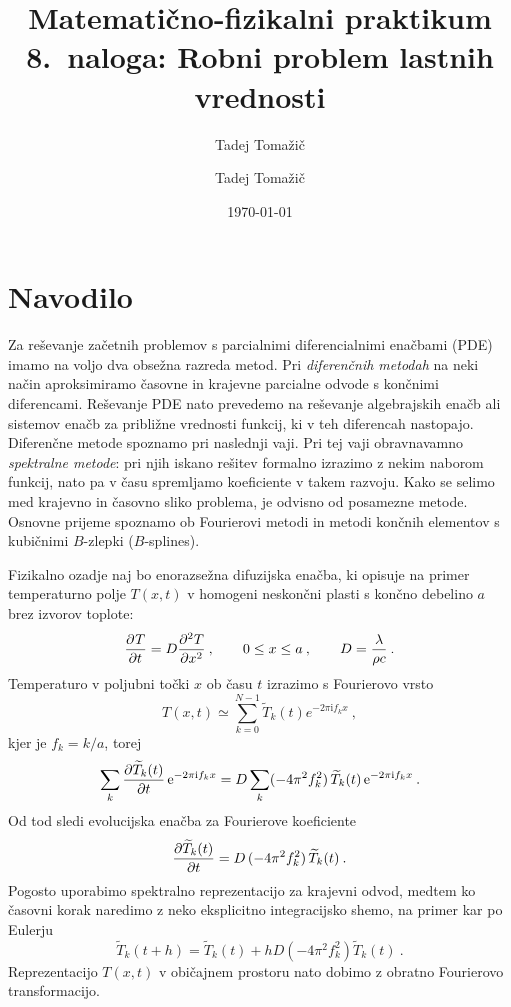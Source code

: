 \documentclass[slovene,11pt,a4paper]{article}
\title{
\sc\large Matematično-fizikalni praktikum \thisyear \\
\bigskip
\bf\Large 8.~naloga: Robni problem lastnih vrednosti
}
\author{Tadej Tomažič}
\date{}
\newcommand{\pd}{\partial}
\newcommand{\Pd}[3][{}]{\frac{\pd^{#1} #2}{\pd #3^{#1}}}
\begin{document}
\author{Tadej Tomažič}
\date{\today}

\maketitle

\newpage
{}
\tableofcontents
\listoffigures
\newpage
\vspace{-1cm}
\section{Navodilo}

Za reševanje začetnih problemov s parcialnimi diferencialnimi
enačbami (PDE) imamo na voljo dva obsežna razreda metod.
Pri {\sl diferenčnih metodah\/} na neki način aproksimiramo
časovne in krajevne parcialne odvode s končnimi diferencami.
Reševanje PDE nato prevedemo na reševanje algebrajskih enačb
ali sistemov enačb za približne vrednosti funkcij, ki v teh
diferencah nastopajo.  Diferenčne metode spoznamo pri
naslednji vaji.  Pri tej vaji obravnavamno {\sl spektralne metode\/}:
pri njih iskano rešitev formalno izrazimo z nekim naborom funkcij,
nato pa v času spremljamo koeficiente v takem razvoju.  Kako se
selimo med krajevno in časovno sliko problema, je odvisno
od posamezne metode.  Osnovne prijeme spoznamo ob Fourierovi
metodi in  metodi končnih elementov s kubičnimi $B$-zlepki ($B$-splines).

Fizikalno ozadje naj bo enorazsežna difuzijska enačba,
ki opisuje na primer temperaturno polje $T(x,t)$ v homogeni
neskončni plasti s končno debelino $a$ brez izvorov toplote:
\begin{equation*}
\Pd{T}{t} = D\Pd[2]{T}{x}
 \>, \qquad 0\le x \le a \>, \qquad D={\lambda\over \rho c} \>.
\end{equation*}
Temperaturo v poljubni točki $x$ ob času $t$ izrazimo
s Fourierovo vrsto
\begin{equation*}
T(x,t) \simeq \sum_{k=0}^{N-1} \widetilde{T}_k(t)
e^{-2\pi\mathrm{i} f_k x} \>,
\end{equation*}
kjer je $f_k = k/a$, torej
\begin{equation*}
\sum_k {\partial\widetilde{T}_k(t)\over\partial t}\,
\mathrm{e}^{-2\pi\mathrm{i} f_k x} =
D \sum_k (-4\pi^2 f_k^2) \, \widetilde{T}_k(t) \,
\mathrm{e}^{-2\pi\mathrm{i} f_k x} \>.
\end{equation*}
Od tod sledi evolucijska enačba za Fourierove koeficiente
\begin{equation}
{\partial\widetilde{T}_k(t)\over\partial t} =
D \, (-4\pi^2 f_k^2) \, \widetilde{T}_k(t) \>.
\label{eq:num}
\end{equation}
Pogosto uporabimo spektralno reprezentacijo za krajevni odvod,
medtem ko časovni korak naredimo z neko eksplicitno integracijsko
shemo, na primer kar po Eulerju
\begin{equation}
\widetilde{T}_k(t+h) = \widetilde{T}_k(t)
+ h D (-4\pi^2 f_k^2) \widetilde{T}_k(t) \>.
\label{ffteuler}
\end{equation}
Reprezentacijo $T(x,t)$ v običajnem prostoru nato dobimo
z obratno Fourierovo transformacijo.
\end{document}
